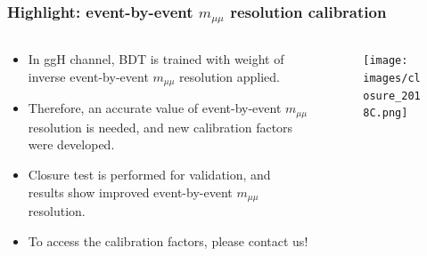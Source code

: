 \documentclass[dvipsnames,aspectratio=169]{beamer}
\begin{document}
\begin{frame}
    \frametitle{Highlight: event-by-event $m_{\mu\mu}$ resolution calibration}
    \begin{columns}
        
    \begin{column}{0.5\textwidth}
    
    \begin{itemize}
    \item { In ggH channel, BDT is trained with weight of inverse event-by-event $m_{\mu\mu}$ resolution applied.}
    \item { Therefore, an accurate value of event-by-event $m_{\mu\mu}$ resolution is needed, and new calibration factors were developed.}
    \item {Closure test is performed for validation, and results show improved event-by-event $m_{\mu\mu}$ resolution.}
    \item To access the calibration factors, please contact us!
    \end{itemize}
    \end{column}

    \begin{column}{0.5\textwidth}
            \begin{figure}
        \centering
        \texttt{[image: images/closure\_2018C.png]}%
        \label{fig:enter-label}
    \end{figure}
    \end{column}

    \end{columns}
\end{frame}
\end{document}
